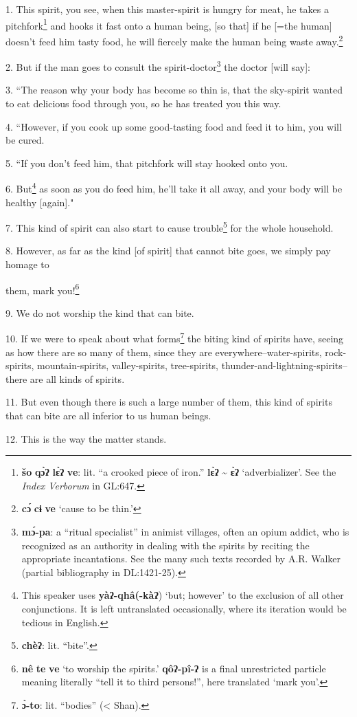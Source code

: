 \setcounter{footnote}{0}


1. This spirit, you see, when this master-spirit is hungry for meat, he takes a
pitchfork\footnote{\textbf{šo} \textbf{qɔ̀ʔ} \textbf{lɛ̀ʔ} \textbf{ve}: lit. ``a crooked piece of iron.'' \textbf{lɛ̀ʔ} \textasciitilde{} \textbf{ɛ̀ʔ} `adverbializer'. See the \textit{Index Verborum} in GL:647.} and hooks it fast onto a human being, [so that] if he [=the human]
doesn't feed him tasty food, he will fiercely make the human being waste away.\footnote{\textbf{cɔ́} \textbf{cɨ} \textbf{ve} `cause to be thin.'}

2. But if the man goes to consult the spirit-doctor\footnote{\textbf{mɔ́-pa}: a ``ritual specialist'' in animist villages, often an opium addict, who is recognized as an authority in dealing with the spirits by reciting the appropriate incantations. See the many such texts recorded by A.R. Walker (partial bibliography in DL:1421-25).} the doctor [will say]:

3. ``The reason why your body has become so thin is, that the sky-spirit
wanted to eat delicious food through you, so he has treated you this way.

4. ``However, if you cook up some good-tasting food and feed it to him,
you will be cured.

5. ``If you don't feed him, that pitchfork will stay hooked onto you.

6. But\footnote{This speaker uses \textbf{yàʔ-qhâ(-kàʔ}) `but; however' to the exclusion of all other conjunctions. It is left untranslated occasionally, where its iteration would be tedious in English.} as soon as you do feed him, he'll take it all away, and your body will
be healthy [again]."

7. This kind of spirit can also start to cause trouble\footnote{\textbf{chèʔ}: lit. ``bite''.} for the whole household.

8. However, as far as the kind [of spirit] that cannot bite goes, we simply pay
homage to

them, mark you!\footnote{\textbf{nê} \textbf{te} \textbf{ve} `to worship the spirits.' \textbf{qôʔ-pî-ʔ} is a final unrestricted particle meaning literally ``tell it to third persons!'', here translated `mark you'.}

9. We do not worship the kind that can bite.

10. If we were to speak about what forms\footnote{\textbf{ɔ̀-to}: lit. ``bodies'' (< Shan).} the biting kind of spirits have, seeing
as how there are so many of them, since they are everywhere--water-spirits, rock-spirits,
mountain-spirits, valley-spirits, tree-spirits, thunder-and-lightning-spirits--there
are all kinds of spirits.

11. But even though there is such a large number of them, this kind of spirits
that can bite are all inferior to us human beings.

12. This is the way the matter stands.


